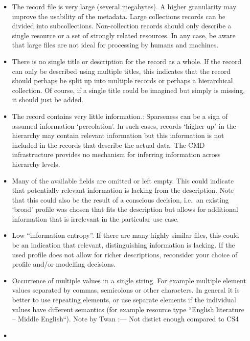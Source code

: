 \begin{itemize}
\tightlist
\item
  The record file is very large (several megabytes). A higher
  granularity may improve the usability of the metadata. Large
  collections records can be divided into subcollections. Non-collection
  records should only describe a single resource or a set of strongly
  related resources. In any case, be aware that large files are not
  ideal for processing by humans and machines.
\item
  There is no single title or description for the record as a whole. If
  the record can only be described using multiple titles, this indicates
  that the record should perhaps be split up into multiple records or
  perhaps a hierarchical collection. Of course, if a single title could
  be imagined but simply is missing, it should just be added.
\item
  The record contains very little information.: Sparseness can be a sign
  of assumed information `percolation'. In such cases, records `higher
  up' in the hierarchy may contain relevant information but this
  information is not included in the records that describe the actual
  data. The CMD infrastructure provides no mechanism for inferring
  information across hierarchy levels.
\item
  Many of the available fields are omitted or left empty. This could
  indicate that potentially relevant information is lacking from the
  description. Note that this could also be the result of a conscious
  decision, i.e.~an existing `broad' profile was chosen that fits the
  description but allows for additional information that is irrelevant
  in the particular use case.
\item
  Low ``information entropy''. If there are many highly similar files,
  this could be an indication that relevant, distinguishing information
  is lacking. If the used profile does not allow for richer
  descriptions, reconsider your choice of profile and/or modelling
  decisions.
\item
  Occurrence of multiple values in a single string. For example multiple
  element values separated by commas, semicolons or other characters. In
  general it is better to use repeating elements, or use separate
  elements if the individual values have different semantics (for
  example resource type ``English literature -- Middle English``).
  \textbar{} Note by Twan \textbar{} \textbar{} :--- \textbar{}
  \textbar{} Not distict enough compared to CS4 \textbar{}
\item

\end{itemize}
